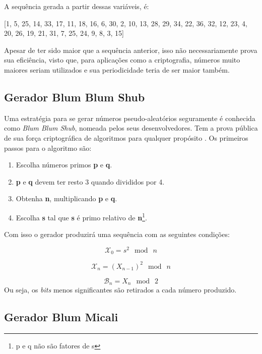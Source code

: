 A sequência gerada a partir dessas variáveis, é:

[1, 5, 25, 14, 33, 17, 11, 18, 16, 6, 30, 2, 10, 13, 28, 29, 34, 22, 36, 32, 12, 23, 4, 20, 26, 19, 21, 31, 7, 25, 24, 9, 8, 3, 15]

Apesar de ter sido maior que a sequência anterior, isso não necessariamente prova sua eficiência, visto que, para aplicações como a criptografia, números muito maiores seriam utilizados e sua periodicidade teria de ser maior também.


\subsection{Gerador Blum Blum Shub}
Uma estratégia para se gerar números pseudo-aleatórios seguramente é conhecida como \textit{Blum Blum Shub}, nomeada pelos seus desenvolvedores. Tem a prova pública de sua força criptográfica de algoritmos para qualquer propósito \cite{william-stallings}. Os primeiros passos para o algoritmo são:

\begin{enumerate}
	\item Escolha números primos \textbf{p} e \textbf{q}.
	\item \textbf{p} e \textbf{q} devem ter resto 3 quando divididos por 4.
	\item Obtenha \textbf{n}, multiplicando \textbf{p} e \textbf{q}.
	\item Escolha \textbf{s} tal que \textbf{s} é primo relativo de \textbf{n}\footnote{p e q não são fatores de s}.
\end{enumerate}

Com isso o gerador produzirá uma sequência com as seguintes condições:

\begin{equation}
	\label{Equação para produzir a sequência}
	\mathcal{X}_0 = s^2\: \bmod \: n
\end{equation}

\begin{equation}
	\label{Equação para produzir a sequência}
	\mathcal{X}_n = (X_{n-1})^2 \: \bmod \: n
\end{equation}

\begin{equation}
	\label{Equação para produzir a sequência}
	\mathcal{B}_n = X_n \: \bmod \: 2
\end{equation}
Ou seja, os \textit{bits} menos significantes são retirados a cada número produzido.

\subsection{Gerador Blum Micali}
\label{blum-micali-generator}

